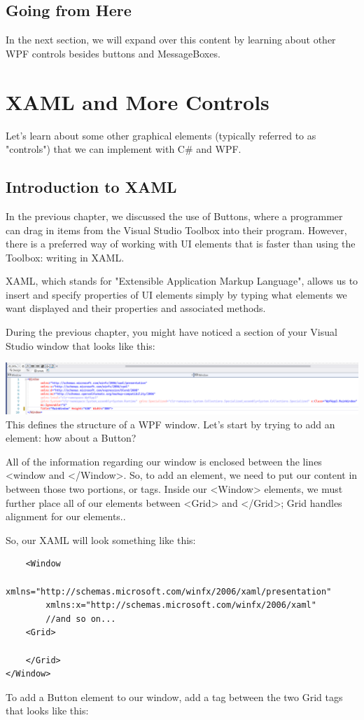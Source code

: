 \documentclass[oneside, openany] {book}
\begin{document}
\section*{Going from Here}
In the next section, we will expand over this content by learning about other WPF controls besides buttons and MessageBoxes.

\chapter{XAML and More Controls}
\minitoc
Let's learn about some other graphical elements (typically referred to as "controls") that we can implement with C\# and WPF.

\section{Introduction to XAML}
In the previous chapter, we discussed the use of Buttons, where a programmer can drag in items from the Visual Studio Toolbox into their program. However, there is a preferred way of working with UI elements that is faster than using the Toolbox: writing in XAML.

XAML, which stands for "Extensible Application Markup Language", allows us to insert and specify properties of UI elements simply by typing what elements we want displayed and their properties and associated methods.

During the previous chapter, you might have noticed a section of your Visual Studio window that looks like this:


\includegraphics[scale=0.11]{XAMLIntro.png}
This defines the structure of a WPF window. Let's start by trying to add an element: how about a Button?

All of the information regarding our window is enclosed between the lines <window and </Window>. So, to add an element, we need to put our content in between those two portions, or tags. Inside our <Window> elements, we must further place all of our elements between <Grid> and </Grid>; Grid handles alignment for our elements..

So, our XAML will look something like this:

\begin{verbatim}
    <Window
        xmlns="http://schemas.microsoft.com/winfx/2006/xaml/presentation"
        xmlns:x="http://schemas.microsoft.com/winfx/2006/xaml"
        //and so on...
    <Grid>
    
    </Grid>
</Window>
\end{verbatim}
To add a Button element to our window, add a tag between the two Grid tags that looks like this:
\end{document}

